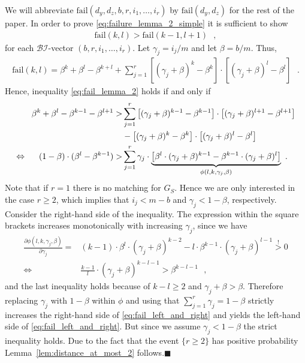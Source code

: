 \let\accentvec\vec \documentclass{llncs}
\newcommand{\proofEnd}{{\hfill\ensuremath{\blacksquare}}}
\newcommand{\degr}{\ensuremath{d}}
\newcommand{\cells}{\ensuremath{m}}
\newcommand{\blank}{\text{ }}
\newcommand{\graph}{\ensuremath{G}}
\newcommand{\low}{\ensuremath{l}}
\newcommand{\high}{\ensuremath{k}}
\newcommand{\evP}{{\mathcal{BI}}}
\newcommand{\fail}{\mathrm{fail}}
\newcommand{\bl}{\beta}
\newcommand{\hf}{\gamma}
\begin{document}
We will abbreviate $\fail({\degr_y},{\degr_z},b,r,i_1,\ldots,i_r)$ by $\fail({\degr_y},{\degr_z})$
for the rest of the paper. In order to prove \eqref{eq:failure_lemma_2_simple} it is sufficient to show
\begin{align}
\label{eq:fail_lemma_2}
  \fail(\high,\low)>\fail(\high-1,\low+1)\blank,
\end{align}
for each $\evP$-vector $(b,r,i_1,\ldots,i_r)$.
Let $\hf_j=i_j/\cells$ and let $\bl=b/\cells$. Thus,
\begin{align}
\label{eq:fail}
 \fail(\high,\low)=\bl^\high + \bl^\low - \bl^{\high+\low} + \sum_{j=1}^r \left[(\hf_j+\bl)^\high-\bl^\high \right] \cdot\left[(\hf_j+\bl)^\low-\bl^\low \right] \blank.
\end{align}
Hence, inequality \eqref{eq:fail_lemma_2} holds if and only if \begin{align}
\label{eq:fail_left_and_right}
 \bl^\high + \bl^\low - \bl^{\high-1} - \bl^{\low+1}  >&\sum_{j=1}^r \left[(\hf_j+\bl)^{\high-1}-\bl^{\high-1} \right] \cdot\left[(\hf_j+\bl)^{\low+1}-\bl^{\low+1} \right] \notag\\
                                   &         - \left[(\hf_j+\bl)^\high-\bl^\high \right] \cdot\left[(\hf_j+\bl)^\low-\bl^\low \right]\notag\\
\Leftrightarrow \hspace{0.5cm}
(1-\bl)\cdot (\bl^\low -\bl^{\high-1})>& \sum_{j=1}^r \hf_j\cdot \underbrace{\left[\bl^\low \cdot(\hf_j+\bl)^{\high-1} -\bl^{\high-1}\cdot(\hf_j+\bl)^\low  \right]}_{\phi(\low,\high,\hf_j,\bl)} \blank.
\end{align}
Note that if $r=1$ there is no matching for $\graph_S$. Hence we are only interested in the case $r\geq2$, which
implies that $i_j<\cells-b$ and $\hf_j<1-\bl$, respectively.
Consider the right-hand side of the inequality. The expression within the square brackets increases monotonically with increasing $\hf_j$,
since we have
\begin{align*}
 \frac{\partial\phi(\low,\high,\hf_j,\bl)}{\partial \hf_j}=&(\high-1)\cdot \bl^\low \cdot(\hf_j+\bl)^{\high-2}-\low\cdot \bl^{\high-1}\cdot(\hf_j+\bl)^{\low-1} \overset{!}{>}0\\
\Leftrightarrow  \ & \frac{\high-1}{\low} \cdot (\hf_j+\bl)^{\high-\low-1} > \bl^{\high-\low-1} \blank,
\end{align*}
and the last inequality holds because of $\high-\low \geq 2$ and $\hf_j+\bl > \bl$.
Therefore replacing $\hf_j$ with $1-\bl$ within $\phi$ and using that $\sum_{j=1}^r \hf_j = 1-\bl$
strictly increases the right-hand side of \eqref{eq:fail_left_and_right} and yields the left-hand side of \eqref{eq:fail_left_and_right}.
But since we assume $\hf_j<1-\bl$ the strict inequality holds.
Due to the fact that the event $\{r\geq 2\}$ has positive probability Lemma~\ref{lem:distance_at_most_2} follows.\proofEnd
\end{document}
